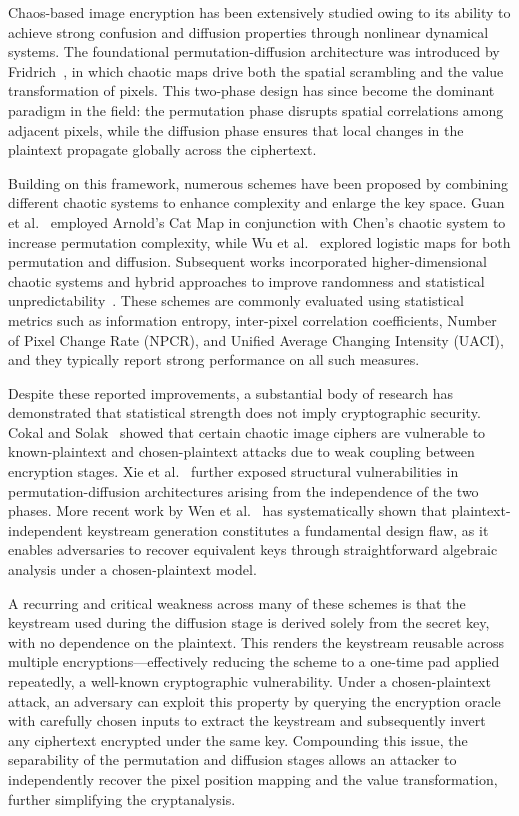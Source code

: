 Chaos-based image encryption has been extensively studied owing to its ability to achieve strong confusion and diffusion properties through nonlinear dynamical systems. The foundational permutation-diffusion architecture was introduced by \\ Fridrich~\cite{fridrich1998symmetric}, in which chaotic maps drive both the spatial scrambling and the value transformation of pixels. This two-phase design has since become the dominant paradigm in the field: the permutation phase disrupts spatial correlations among adjacent pixels, while the diffusion phase ensures that local changes in the plaintext propagate globally across the ciphertext.

Building on this framework, numerous schemes have been proposed by combining different chaotic systems to enhance complexity and enlarge the key space. Guan et al.~\cite{guan2005chaos} employed Arnold's Cat Map in conjunction with Chen's chaotic system to increase permutation complexity, while Wu et al.~\cite{wu2012image} explored logistic maps for both permutation and diffusion. Subsequent works incorporated higher-dimensional chaotic systems and hybrid approaches to improve randomness and statistical unpredictability~\cite{mursi2014image, hua2018lscm, jain2021medical}. These schemes are commonly evaluated using statistical metrics such as information entropy, inter-pixel correlation coefficients, Number of Pixel Change Rate (NPCR), and Unified Average Changing Intensity (UACI), and they typically report strong performance on all such measures.

Despite these reported improvements, a substantial body of research has demonstrated that statistical strength does not imply cryptographic security. Cokal and Solak~\cite{cokal2009cryptanalysis} showed that certain chaotic image ciphers are vulnerable to known-plaintext and chosen-plaintext attacks due to weak coupling between encryption stages. Xie et al.~\cite{xie2017cryptanalysis} further exposed structural vulnerabilities in permutation-diffusion architectures arising from the independence of the two phases. More recent work by Wen et al.~\cite{wen2023cryptanalysis, wen2024cryptanalysis, wen2023lin} has systematically shown that plaintext-independent keystream generation constitutes a fundamental design flaw, as it enables adversaries to recover equivalent keys through straightforward algebraic analysis under a chosen-plaintext model.

A recurring and critical weakness across many of these schemes is that the keystream used during the diffusion stage is derived solely from the secret key, with no dependence on the plaintext. This renders the keystream reusable across multiple encryptions---effectively reducing the scheme to a one-time pad applied repeatedly, a well-known cryptographic vulnerability. Under a chosen-plaintext attack, an adversary can exploit this property by querying the encryption oracle with carefully chosen inputs to extract the keystream and subsequently invert any ciphertext encrypted under the same key. Compounding this issue, the separability of the permutation and diffusion stages allows an attacker to independently recover the pixel position mapping and the value transformation, further simplifying the cryptanalysis.

